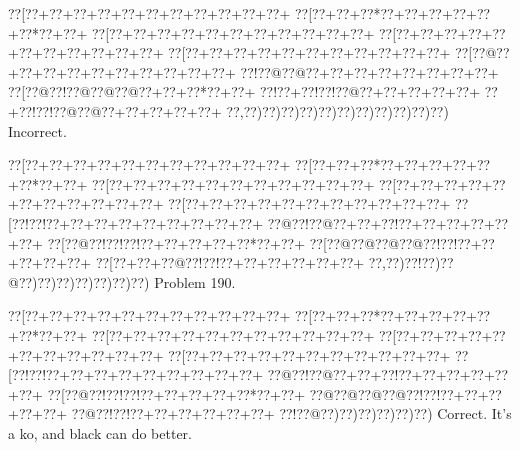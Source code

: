 \documentclass[a5paper]{article}
\begin{document}
\begin{center}
{\goo
\0??[\0??+\0??+\0??+\0??+\0??+\0??+\0??+\0??+\0??+\0??+\0??+
\0??[\0??+\0??+\0??*\0??+\0??+\0??+\0??+\0??+\0??*\0??+\0??+
\0??[\0??+\0??+\0??+\0??+\0??+\0??+\0??+\0??+\0??+\0??+\0??+
\0??[\0??+\0??+\0??+\0??+\0??+\0??+\0??+\0??+\0??+\0??+\0??+
\0??[\0??+\0??+\0??+\0??+\0??+\0??+\0??+\0??+\0??+\0??+\0??+
\0??[\0??@\0??+\0??+\0??+\0??+\0??+\0??+\0??+\0??+\0??+\0??+
\0??!\0??@\0??@\0??+\0??+\0??+\0??+\0??+\0??+\0??+\0??+
\0??[\0??@\0??!\0??@\0??@\0??@\0??+\0??+\0??*\0??+\0??+
\0??!\0??+\0??!\0??!\0??@\0??+\0??+\0??+\0??+\0??+
\0??+\0??!\0??!\0??@\0??@\0??+\0??+\0??+\0??+\0??+
\0??,\0??)\0??)\0??)\0??)\0??)\0??)\0??)\0??)\0??)\0??)\0??)
}
Incorrect. 

\end{center}
\newpage
\begin{center}
{\goo
\0??[\0??+\0??+\0??+\0??+\0??+\0??+\0??+\0??+\0??+\0??+\0??+
\0??[\0??+\0??+\0??*\0??+\0??+\0??+\0??+\0??+\0??*\0??+\0??+
\0??[\0??+\0??+\0??+\0??+\0??+\0??+\0??+\0??+\0??+\0??+\0??+
\0??[\0??+\0??+\0??+\0??+\0??+\0??+\0??+\0??+\0??+\0??+\0??+
\0??[\0??+\0??+\0??+\0??+\0??+\0??+\0??+\0??+\0??+\0??+\0??+
\0??[\0??!\0??!\0??+\0??+\0??+\0??+\0??+\0??+\0??+\0??+\0??+
\0??@\0??!\0??@\0??+\0??+\0??!\0??+\0??+\0??+\0??+\0??+\0??+
\0??[\0??@\0??!\0??!\0??!\0??+\0??+\0??+\0??+\0??*\0??+\0??+
\0??[\0??@\0??@\0??@\0??@\0??!\0??!\0??+\0??+\0??+\0??+\0??+
\0??[\0??+\0??+\0??@\0??!\0??!\0??+\0??+\0??+\0??+\0??+\0??+
\0??,\0??)\0??!\0??)\0??@\0??)\0??)\0??)\0??)\0??)\0??)\0??)
}
Problem 190.

\end{center}
\begin{center}
{\goo
\0??[\0??+\0??+\0??+\0??+\0??+\0??+\0??+\0??+\0??+\0??+\0??+
\0??[\0??+\0??+\0??*\0??+\0??+\0??+\0??+\0??+\0??*\0??+\0??+
\0??[\0??+\0??+\0??+\0??+\0??+\0??+\0??+\0??+\0??+\0??+\0??+
\0??[\0??+\0??+\0??+\0??+\0??+\0??+\0??+\0??+\0??+\0??+\0??+
\0??[\0??+\0??+\0??+\0??+\0??+\0??+\0??+\0??+\0??+\0??+\0??+
\0??[\0??!\0??!\0??+\0??+\0??+\0??+\0??+\0??+\0??+\0??+\0??+
\0??@\0??!\0??@\0??+\0??+\0??!\0??+\0??+\0??+\0??+\0??+\0??+
\0??[\0??@\0??!\0??!\0??!\0??+\0??+\0??+\0??+\0??*\0??+\0??+
\0??@\0??@\0??@\0??@\0??!\0??!\0??+\0??+\0??+\0??+\0??+
\0??@\0??!\0??!\0??+\0??+\0??+\0??+\0??+\0??+
\0??!\0??@\0??)\0??)\0??)\0??)\0??)\0??)
}
Correct. It's a ko, and black can do better.

\end{center}
\end{document}
